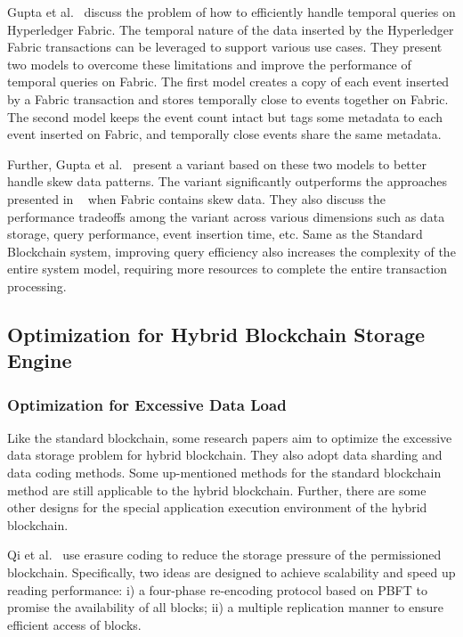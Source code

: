\documentclass[acmsmall]{acmart}
\begin{document}
Gupta et al.~\cite{gupta2018efficiently} discuss the problem of how to efficiently handle temporal queries on Hyperledger Fabric. The temporal nature of the data inserted by the Hyperledger Fabric transactions can be leveraged to support various use cases. They present two models to overcome these limitations and improve the performance of temporal queries on Fabric. The first model creates a copy of each event inserted by a Fabric transaction and stores temporally close to events together on Fabric. The second model keeps the event count intact but tags some metadata to each event inserted on Fabric, and temporally close events share the same metadata.

Further, Gupta et al.~\cite{gupta2018building} present a variant based on these two models to better handle skew data patterns. The variant significantly outperforms the approaches presented in ~\cite{gupta2018efficiently} when Fabric contains skew data. They also discuss the performance tradeoffs among the variant across various dimensions such as data storage, query performance, event insertion time, etc.
Same as the Standard Blockchain system, improving query efficiency also increases the complexity of the entire system model, requiring more resources to complete the entire transaction processing.


\subsection{Optimization for Hybrid Blockchain Storage Engine}


\subsubsection{Optimization for Excessive Data Load}
Like the standard blockchain, some research papers aim to optimize the excessive data storage problem for hybrid blockchain. They also adopt data sharding and data coding methods. Some up-mentioned methods for the standard blockchain method are still applicable to the hybrid blockchain. Further, there are some other designs for the special application execution environment of the hybrid blockchain.



Qi et al.~\cite{DBLP:conf/icde/QiZJZ20} use erasure coding to reduce the storage pressure of the permissioned blockchain. Specifically, two ideas are designed to achieve scalability and speed up reading performance: i) a four-phase re-encoding protocol based on PBFT to promise the availability of all blocks; ii) a multiple replication manner to ensure efficient access of blocks.
\end{document}
